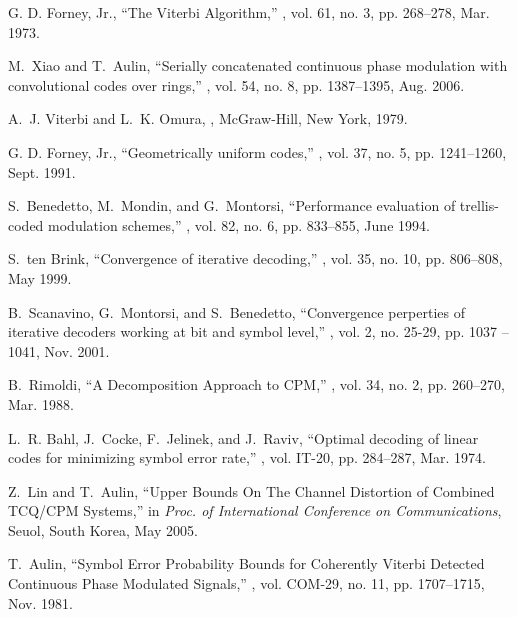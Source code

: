 \documentclass[12pt,twoside,onecolumn,a4paper,english]{IEEEtran2e}
\begin{document}
\begin{thebibliography}{10}
{G. D. Forney, Jr.},
\newblock ``The {V}iterbi {A}lgorithm,''
, vol. 61, no. 3, pp. 268--278, Mar.
  1973.

M.~Xiao and T.~Aulin,
\newblock ``Serially concatenated continuous phase modulation with
  convolutional codes over rings,''
, vol. 54, no. 8, pp. 1387--1395, Aug. 2006.

A.~J. Viterbi and L.~K. Omura,
,
\newblock McGraw-Hill, New York, 1979.

{G. D. Forney, Jr.},
\newblock ``Geometrically uniform codes,''
, vol. 37, no. 5, pp. 1241--1260,
  Sept. 1991.

S.~Benedetto, M.~Mondin, and G.~Montorsi,
\newblock ``Performance evaluation of trellis-coded modulation schemes,''
, vol. 82, no. 6, pp. 833--855, June 1994.

S.~ten Brink,
\newblock ``Convergence of iterative decoding,''
, vol. 35, no. 10, pp. 806--808, May 1999.

B.~Scanavino, G.~Montorsi, and S.~Benedetto,
\newblock ``Convergence perperties of iterative decoders working at bit and
  symbol level,''
, vol. 2, no.
  25-29, pp. 1037 --1041, Nov. 2001.

B.~Rimoldi,
\newblock ``A {D}ecomposition {A}pproach to {CPM},''
, vol. 34, no. 2, pp. 260--270, Mar.
  1988.

L.~R. Bahl, J.~Cocke, F.~Jelinek, and J.~Raviv,
\newblock ``Optimal decoding of linear codes for minimizing symbol error
  rate,''
, vol. IT-20, pp. 284--287, Mar.
  1974.

Z.~Lin and T.~Aulin,
\newblock ``{Upper Bounds On The Channel Distortion of Combined TCQ/CPM
  Systems},''
\newblock in {\em Proc. of International Conference on Communications}, Seuol,
  South Korea, May 2005.

T.~Aulin,
\newblock ``Symbol {E}rror {P}robability {B}ounds for {C}oherently {V}iterbi
  {D}etected {C}ontinuous {P}hase {M}odulated {S}ignals,''
, vol. COM-29, no. 11, pp. 1707--1715, Nov.
  1981.


\end{thebibliography}
\end{document}
